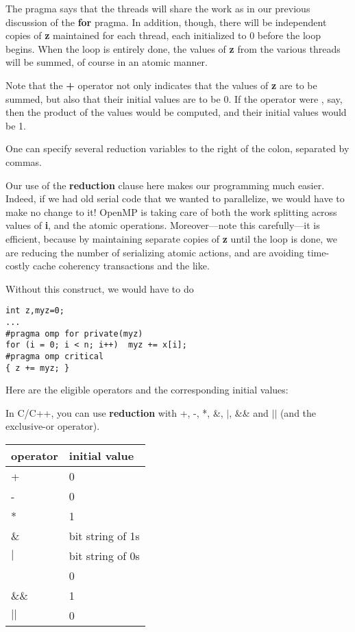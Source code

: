 The pragma says that the threads will share the work as in our previous
discussion of the {\bf for} pragma.  In addition, though, there will be
independent copies of {\bf z} maintained for each thread, each
initialized to 0 before the loop begins.  When the loop is entirely
done, the values of {\bf z} from the various threads will be summed, of
course in an atomic manner.

Note that the {\bf +} operator not only indicates that the values of {\bf z}
are to be summed, but also that their initial values are to be 0.  If
the operator were {\bf *}, say, then the product of the values would be
computed, and their initial values would be 1.

One can specify several reduction variables to the right of the colon,
separated by commas.

Our use of the {\bf reduction} clause here makes our programming much
easier.  Indeed, if we had old serial code that we wanted to parallelize,
we would have to make no change to it!  OpenMP is taking care of both
the work splitting across values of {\bf i}, and the atomic operations.
Moreover---note this carefully---it is efficient, because by maintaining
separate copies of {\bf z} until the loop is done, we are reducing the
number of serializing atomic actions, and are avoiding time-costly cache
coherency transactions and the like.

Without this construct, we would have to do

\begin{Verbatim}[fontsize=\relsize{-2}]
int z,myz=0;
...
#pragma omp for private(myz)
for (i = 0; i < n; i++)  myz += x[i];
#pragma omp critical
{ z += myz; }
\end{Verbatim}

Here are the eligible operators and the corresponding initial values:

In C/C++, you can use {\bf reduction} with +, -, *, \&, $|$, \&\& and
$||$ (and the exclusive-or operator).

\begin{tabular}{|l|l|}
\hline
operator & initial value \\ \hline
\hline
+ & 0 \\ \hline
- & 0 \\ \hline
* & 1 \\ \hline
\& & bit string of 1s \\ \hline
$|$ & bit string of 0s \\ \hline
\verb1^1 & 0 \\ \hline
\&\& & 1 \\ \hline
$||$ & 0 \\ \hline
\end{tabular}

